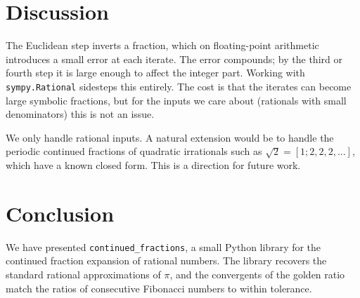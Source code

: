 \documentclass[11pt]{article}
\begin{document}
\section{Discussion}

The Euclidean step inverts a fraction, which on
floating-point arithmetic introduces a small error at each iterate. The
error compounds; by the third or fourth step it is large enough to
affect the integer part. Working with \texttt{sympy.Rational} sidesteps
this entirely. The cost is that the iterates can become large symbolic
fractions, but for the inputs we care about (rationals with small
denominators) this is not an issue.

We only handle rational inputs. A natural
extension would be to handle the periodic continued fractions of
quadratic irrationals such as \(\sqrt{2} = [1; 2, 2, 2, \dots]\), which
have a known closed form. This is a direction for future work.

\section{Conclusion}

We have presented \texttt{continued\_fractions}, a small Python library
for the continued fraction expansion of rational numbers. The library
recovers the standard rational approximations of \(\pi\), and the
convergents of the golden ratio match the ratios of consecutive
Fibonacci numbers to within tolerance.



\end{document}
